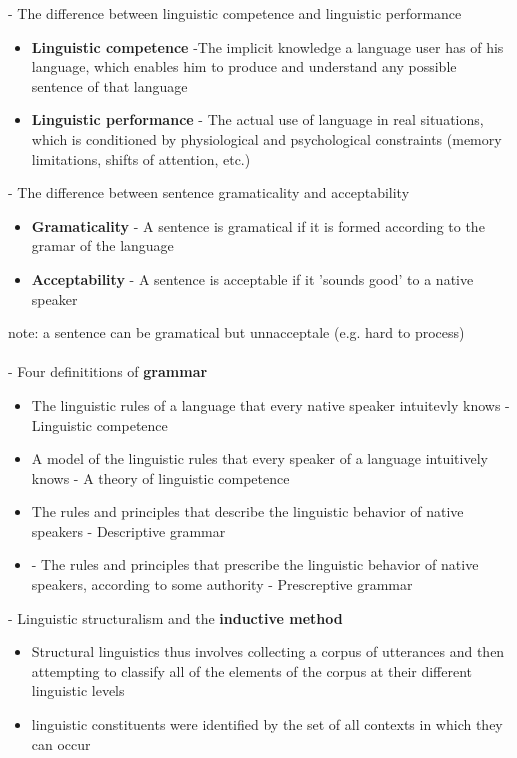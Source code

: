 \documentclass[11pt]{article}
\begin{document}
- The difference between linguistic competence and linguistic performance
\begin{itemize}
 \item \textbf{Linguistic competence} -The implicit knowledge a language user has of his language, which enables him to produce and understand any possible sentence of that language
 \item \textbf{Linguistic performance} - The actual use of language in real situations, which is conditioned by physiological and psychological constraints (memory limitations, shifts of attention, etc.)
\end{itemize}
- The difference between sentence gramaticality and acceptability
\begin{itemize}
 \item \textbf{Gramaticality} - A sentence is gramatical if it is formed according to the gramar of the language
\item \textbf{Acceptability} - A sentence is acceptable if it 'sounds good' to a native speaker
\end{itemize}
note: a sentence can be gramatical but unnacceptale (e.g. hard to process)
\\\\
- Four definititions of \textbf{grammar}
\begin{itemize}
 \item The linguistic rules of a language that every native speaker intuitevly knows - Linguistic competence
\item A model of the linguistic rules that every speaker of a language intuitively knows - A theory of linguistic competence 
\item The rules and principles that describe the linguistic behavior of native speakers - Descriptive grammar
\item - The rules and principles that prescribe the linguistic behavior of native speakers, according to some authority - Prescreptive grammar
\end{itemize}
- Linguistic structuralism and the \textbf{inductive method} 
\begin{itemize}
 \item Structural linguistics thus involves collecting a corpus of utterances and then attempting to classify all of the elements of the corpus at their different linguistic levels
\item linguistic constituents were identified by the set of all contexts in which they can occur
\end{itemize}
\end{document}
